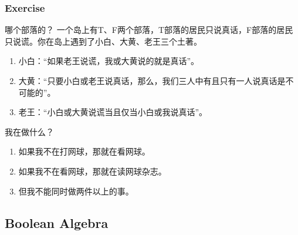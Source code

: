 \documentclass[UTF8,aspectratio=43,11pt,colorlinks,compress,openany]{beamer}%
\begin{document}
\begin{frame}\frametitle{Exercise}
		\begin{block}{哪个部落的？}
		一个岛上有T、F两个部落，T部落的居民只说真话，F部落的居民只说谎。你在岛上遇到了小白、大黄、老王三个土著。
			\begin{enumerate}
				\item 小白：“如果老王说谎，我或大黄说的就是真话”。
				\item 大黄：“只要小白或老王说真话，那么，我们三人中有且只有一人说真话是不可能的”。
				\item 老王：“小白或大黄说谎当且仅当小白或我说真话”。
			\end{enumerate}
		\end{block}
		\begin{block}{我在做什么？}
			\begin{enumerate}
				\item 如果我不在打网球，那就在看网球。
				\item 如果我不在看网球，那就在读网球杂志。
				\item 但我不能同时做两件以上的事。
			\end{enumerate}
		\end{block}
\end{frame}

\subsection{Boolean Algebra}
\end{document}

